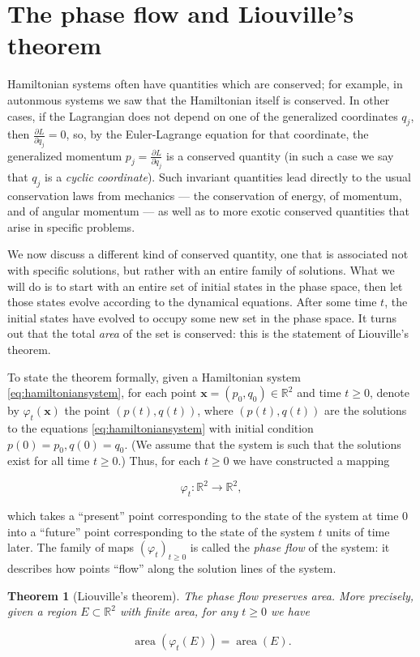 \documentclass[11pt]{report}
\theoremstyle{plain}
\newtheorem{thm}{Theorem}[chapter]
\theoremstyle{definition}
\begin{document}
\section{The phase flow and Liouville's theorem}

Hamiltonian systems often have quantities which are
conserved; for example, in autonmous systems we saw
that the Hamiltonian itself is conserved. In other
cases, if the Lagrangian does not depend on one of the
generalized coordinates $q_j$, then
$\frac{\partial L}{\partial q_j}=0$, so, by the
Euler-Lagrange equation for that coordinate, the
generalized momentum
$p_j = \frac{\partial L}{\partial \dot{q}_j}$ is a
conserved quantity (in such a case we say that $q_j$
is a \emph{cyclic coordinate}). Such invariant quantities
lead directly to the usual conservation laws from
mechanics --- the conservation of energy, of momentum,
and of angular momentum --- as well as to more exotic
conserved quantities that arise in specific problems.

We now discuss a different kind of conserved quantity,
one that is associated not with specific solutions,
but rather with an entire family of solutions. What we
will do is to start with an entire set of initial
states in the phase space, then let those states
evolve according to the dynamical equations. After
some time $t$, the initial states have evolved to
occupy some new set in the phase space. It turns out
that the total \emph{area} of the set is conserved: this is
the statement of Liouville's theorem.

To state the theorem formally, given a Hamiltonian
system \eqref{eq:hamiltoniansystem}, for each point
$\mathbf{x}=(p_0,q_0)\in\mathbb{R}^2$ and time
$t\ge 0$, denote by $\varphi_t(\mathbf{x})$ the point
$(p(t),q(t))$, where $(p(t),q(t))$ are the solutions
to the equations \eqref{eq:hamiltoniansystem} with initial
condition $p(0)=p_0, q(0)=q_0$. (We assume that the
system is such that the solutions exist for all time
$t\ge 0$.) Thus, for each $t\ge 0$ we have constructed
a mapping

\[
\varphi_t:\mathbb{R}^2\to\mathbb{R}^2,
\]

\noindent which takes a ``present'' point corresponding to the
state of the system at time $0$ into a ``future''
point corresponding to the state of the system $t$
units of time later. The family of maps
$(\varphi_t)_{t\ge 0}$ is called the \emph{phase flow} of
the system: it describes how points ``flow'' along the
solution lines of the system.

\begin{thm}[Liouville's theorem]
The phase flow preserves area. More precisely, given a
region $E\subset\mathbb{R}^2$ with finite area, for
any $t\ge 0$ we have

\begin{align*}
\operatorname{area}(\varphi_t(E)) = \operatorname{area}(E).
\end{align*}

\end{thm}
\end{document}
